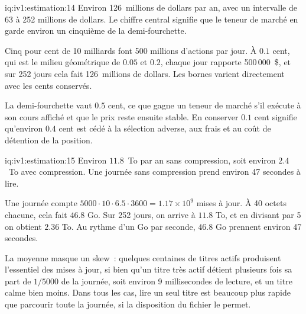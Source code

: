 \begin{solution}{iq:iv1:estimation:14}
Environ 126~millions de dollars par an, avec un intervalle de 63 à 252 millions de dollars. Le chiffre central signifie que le teneur de marché en garde environ un cinquième de la demi-fourchette.

Cinq pour cent de 10 milliards font 500 millions d'actions par jour. À $0.1$ cent, qui est le milieu géométrique de $0.05$ et $0.2$, chaque jour rapporte 500\,000~\$, et sur 252 jours cela fait 126~millions de dollars. Les bornes varient directement avec les cents conservés.

La demi-fourchette vaut $0.5$ cent, ce que gagne un teneur de marché s'il exécute à son cours affiché et que le prix reste ensuite stable. En conserver $0.1$ cent signifie qu'environ $0.4$ cent est cédé à la sélection adverse, aux frais et au coût de détention de la position.

\end{solution}

\begin{solution}{iq:iv1:estimation:15}
Environ $11.8$~To par an sans compression, soit environ $2.4$~To avec compression. Une journée sans compression prend environ 47 secondes à lire.

Une journée compte $5000 \cdot 10 \cdot 6.5 \cdot 3600 = 1.17 \times 10^9$ mises à jour. À 40 octets chacune, cela fait $46.8$ Go. Sur 252 jours, on arrive à $11.8$ To, et en divisant par 5 on obtient $2.36$ To. Au rythme d'un Go par seconde, $46.8$ Go prennent environ 47 secondes.

La moyenne masque un skew~: quelques centaines de titres actifs produisent l'essentiel des mises à jour, si bien qu'un titre très actif détient plusieurs fois sa part de $1/5000$ de la journée, soit environ 9 millisecondes de lecture, et un titre calme bien moins. Dans tous les cas, lire un seul titre est beaucoup plus rapide que parcourir toute la journée, si la disposition du fichier le permet.

\end{solution}

